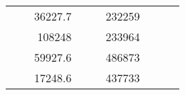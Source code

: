 \begin{table}[H]
\begin{tabular}{|ccrccrccc}
\multicolumn{1}{|c|}{\cellcolor[HTML]{FFFFC7}}                                & \multicolumn{1}{c|}{\cellcolor[HTML]{DAE8FC}}                      & \multicolumn{1}{r|}{\cellcolor[HTML]{DAE8FC}36227.7}   & \multicolumn{1}{c|}{\cellcolor[HTML]{FFFFC7}}                                & \multicolumn{1}{c|}{\cellcolor[HTML]{DAE8FC}}                       & \multicolumn{1}{r|}{\cellcolor[HTML]{DDFDFF}232259}    &                                                                              &                                                                    &                                                        \\ \cline{3-3} \cline{6-6}
\multicolumn{1}{|c|}{\cellcolor[HTML]{FFFFC7}}                                & \multicolumn{1}{c|}{\cellcolor[HTML]{DAE8FC}}                      & \multicolumn{1}{r|}{\cellcolor[HTML]{DDFDFF}108248}    & \multicolumn{1}{c|}{\cellcolor[HTML]{FFFFC7}}                                & \multicolumn{1}{c|}{\cellcolor[HTML]{DAE8FC}}                       & \multicolumn{1}{r|}{\cellcolor[HTML]{DAE8FC}233964}    &                                                                              &                                                                    &                                                        \\ \cline{3-3} \cline{6-6}
\multicolumn{1}{|c|}{\cellcolor[HTML]{FFFFC7}}                                & \multicolumn{1}{c|}{\cellcolor[HTML]{DAE8FC}}                      & \multicolumn{1}{r|}{\cellcolor[HTML]{DAE8FC}59927.6}   & \multicolumn{1}{c|}{\cellcolor[HTML]{FFFFC7}}                                & \multicolumn{1}{c|}{\cellcolor[HTML]{DAE8FC}}                       & \multicolumn{1}{r|}{\cellcolor[HTML]{DDFDFF}486873}    &                                                                              &                                                                    &                                                        \\ \cline{3-3} \cline{6-6}
\multicolumn{1}{|c|}{\cellcolor[HTML]{FFFFC7}}                                & \multicolumn{1}{c|}{\cellcolor[HTML]{DAE8FC}}                      & \multicolumn{1}{r|}{\cellcolor[HTML]{DDFDFF}17248.6}   & \multicolumn{1}{c|}{\cellcolor[HTML]{FFFFC7}}                                & \multicolumn{1}{c|}{\cellcolor[HTML]{DAE8FC}}                       & \multicolumn{1}{r|}{\cellcolor[HTML]{DAE8FC}437733}    &                                                                              &                                                                    &                                                        \\ \cline{3-3} \cline{6-6}

\end{tabular}
\end{table}
